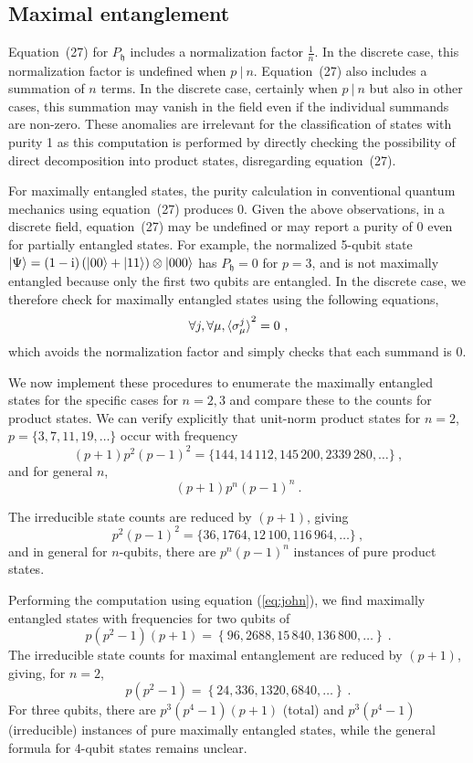 \documentclass{iopart}
\def\fh{\mathfrak{h}}
\begin{document}
\subsection{Maximal entanglement}

Equation~(27) for $P_{\fh}$ includes a normalization factor $\frac{1}{n}$. In the discrete case, this normalization factor is undefined when $p ~|~ n$. Equation~(27) also includes a summation of $n$ terms. In the discrete case, certainly when $p ~|~ n$ but also in other cases, this summation may vanish in the field even if the individual summands are non-zero. These anomalies are irrelevant for the classification of states with purity 1 as this computation is performed by directly checking the possibility of direct decomposition into product states, disregarding equation~(27). 

For maximally entangled states, the purity calculation in conventional quantum mechanics using equation~(27) produces 0. Given the above observations, in a discrete field, equation~(27) may be undefined or may report a purity of 0 even for partially entangled states. For example, the normalized 5-qubit state $\ket{\Psi}=\left(1-\mathrm{i}\right)\left(\ket{00}+\ket{11}\right)\otimes\ket{000}$ has $P_{\fh}=0$ for $p=3$, and is not maximally entangled because only the first two qubits are entangled. In the discrete case, we therefore check for maximally entangled states using the following equations,
\begin{equation}
\forall j,\forall\mu,\braket{\sigma_{\mu}^{j}}^2 =0\textrm{ ,}\label{eq:john}
\end{equation}
which avoids the normalization factor and simply checks that each summand is 0. 

We now implement these procedures to enumerate the maximally entangled states for the specific cases for $n = 2 ,3 $ and compare these to the counts for product states. We can verify explicitly that unit-norm product states for $n=2$,
$p=\{3,7,11,19,\ldots\}$ occur with frequency 
\[
(p+1)p^{2}(p-1)^{2}=\{144,14\,112,145\,200,2339\,280,\ldots\}\ ,
\]
and for general $n$, \[(p+1)p^{n}(p-1)^{n}\ .\]

The irreducible state counts are reduced by $(p+1)$, giving 
\[
p^{2}(p-1)^{2}=\{36,1764,12\,100,116\,964,\ldots\}\ ,
\]
and in general for $n$-qubits, there are $p^{n}\left(p-1\right)^{n}$
instances of pure product states.

Performing the computation using equation (\ref{eq:john}), we find maximally entangled states with
frequencies for two qubits of 
\[
p\left(p^2-1\right)\left(p+1\right)=\left\{ 96,2688,15\,840,136\,800,\ldots\right\} \ .
\]
The irreducible state counts for maximal entanglement are reduced
by $\left(p+1\right)$, giving, for $n=2$, 
\[
p\left(p^{2}-1\right)=\left\{ 24,336,1320,6840,\ldots\right\} \ .
\]
For three qubits, there are $p^{3}\left(p^{4}-1\right)\left(p+1\right)$ (total) and $p^{3}\left(p^{4}-1\right)$ (irreducible) instances of pure maximally entangled states, while the general formula for 4-qubit states remains unclear.
\end{document}
